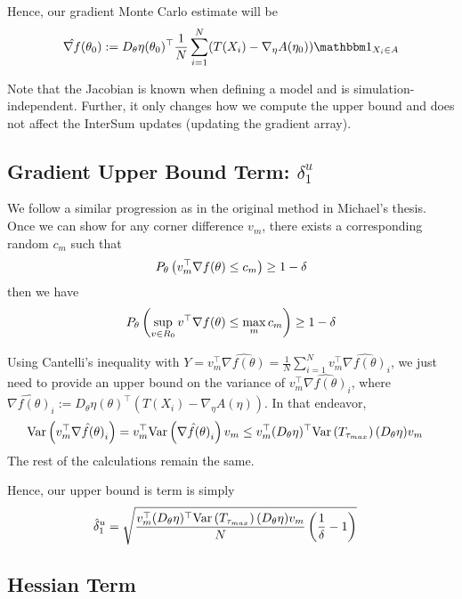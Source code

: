 \documentclass[10pt, a4paper]{article}
\begin{document}
Hence, our gradient Monte Carlo estimate will be
\begin{align*}
    \hat{\nabla f}(\theta_0)
    :=
    D_{\theta} \eta(\theta_0)^\top 
    \frac{1}{N}
    \sum\limits_{i=1}^N
    (T(X_i)-\nabla_\eta A(\eta_0)) \indic{X_i \in A}
\end{align*}

Note that the Jacobian is known when defining a model
and is simulation-independent.
Further, it only changes how we compute the upper bound
and does not affect the InterSum updates (updating the gradient array).

\subsection*{Gradient Upper Bound Term: $\delta_1^u$}

We follow a similar progression as in the original method in Michael's thesis.
Once we can show for any corner difference $v_m$, 
there exists a corresponding random $c_m$ such that
\[
    P_\theta\left(v_m^\top \nabla f(\theta) \leq c_m\right) \geq 1-\delta
\]
then we have
\[
    P_\theta\left(\sup\limits_{v\in R_0} v^\top \nabla f(\theta) \leq \max\limits_{m} c_m\right) \geq 1-\delta
\]

Using Cantelli's inequality
with $Y = v_m^\top \hat{\nabla f(\theta)} = \frac{1}{N} \sum\limits_{i=1}^N v_m^\top \hat{\nabla f(\theta)}_i$,
we just need to provide an upper bound on the variance of $v_m^\top \hat{\nabla f(\theta)}_i$,
where $\hat{\nabla f(\theta)}_i := D_\theta \eta(\theta)^\top (T(X_i)-\nabla_\eta A(\eta))$.
In that endeavor,
\begin{align*}
    \text{Var}\left(v_m^\top \hat{\nabla f(\theta)}_i\right)
    &=
    v_m^\top \text{Var}\left(\hat{\nabla f(\theta)}_i\right) v_m
    \leq 
    v_m^\top (D_\theta \eta)^\top \text{Var}\left(T_{\tau_{max}}\right) (D_\theta \eta) v_m
\end{align*}
The rest of the calculations remain the same.

Hence, our upper bound is term is simply
\begin{align*}
    \hat{\delta}_1^u
    &=
    \sqrt{
        \frac{v_m^\top (D_\theta \eta)^\top \text{Var}\left(T_{\tau_{max}}\right) (D_\theta \eta) v_m}{N}
        \left(\frac{1}{\delta} - 1\right)
    }
\end{align*}

\subsection*{Hessian Term}
\end{document}
